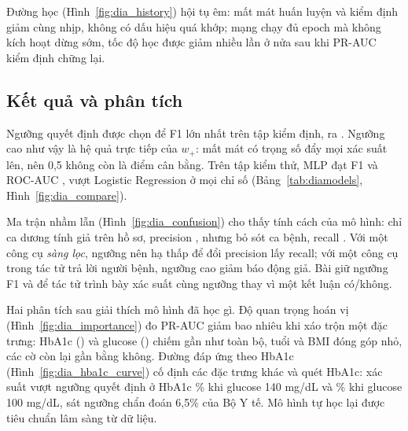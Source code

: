 

Đường học (Hình~\ref{fig:dia_history}) hội tụ êm: mất mát huấn luyện và kiểm định giảm cùng nhịp, không có dấu
hiệu quá khớp; mạng chạy đủ  epoch mà không kích hoạt dừng sớm, tốc độ học được giảm
nhiều lần ở nửa sau khi PR-AUC kiểm định chững lại.


\subsection{Kết quả và phân tích}
Ngưỡng quyết định được chọn để F1 lớn nhất trên tập kiểm định, ra . Ngưỡng cao như vậy
là hệ quả trực tiếp của $w_+$: mất mát có trọng số đẩy mọi xác suất lên, nên 0,5 không còn là điểm cân bằng.
Trên tập kiểm thử, MLP đạt F1  và ROC-AUC , vượt Logistic Regression
ở mọi chỉ số (Bảng~\ref{tab:diamodels}, Hình~\ref{fig:dia_compare}).



Ma trận nhầm lẫn (Hình~\ref{fig:dia_confusion}) cho thấy tính cách của mô hình: chỉ
 ca dương tính giả trên  hồ sơ, precision
, nhưng bỏ sót  ca bệnh, recall
. Với một công cụ \emph{sàng lọc}, ngưỡng nên hạ thấp để đổi precision lấy recall; với một
công cụ trong tác tử trả lời người bệnh, ngưỡng cao giảm báo động giả. Bài giữ ngưỡng F1 và để tác tử trình bày
xác suất cùng ngưỡng thay vì một kết luận có/không.

Hai phân tích sau giải thích mô hình đã học gì. Độ quan trọng hoán vị (Hình~\ref{fig:dia_importance}) đo PR-AUC
giảm bao nhiêu khi xáo trộn một đặc trưng: HbA1c () và glucose
() chiếm gần như toàn bộ, tuổi và BMI đóng góp nhỏ, các cờ còn lại gần bằng
không. Đường đáp ứng theo HbA1c (Hình~\ref{fig:dia_hba1c_curve}) cố định các đặc trưng khác và quét HbA1c: xác suất
vượt ngưỡng quyết định ở HbA1c \% khi glucose 140 mg/dL và \% khi glucose
100 mg/dL, sát ngưỡng chẩn đoán 6,5\% của Bộ Y tế. Mô hình tự học lại được tiêu chuẩn lâm sàng từ dữ liệu.

